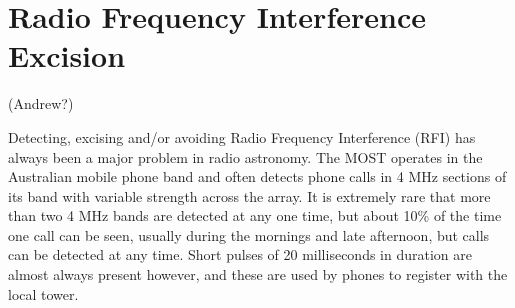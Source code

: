 \section{Radio Frequency Interference Excision} (Andrew?)

Detecting, excising and/or avoiding Radio Frequency Interference (RFI) has always been a major problem in radio astronomy. The MOST operates in the Australian mobile phone band and often detects phone calls in 4 MHz sections of its band with variable strength across the array. It is extremely rare that more than two 4 MHz bands are detected at any one time, but about 10\% of the time one call can be seen, usually during the mornings and late afternoon, but calls can be detected at any time. Short pulses of 20 milliseconds in duration are almost always present however, and these are used by phones to register with the local tower.
